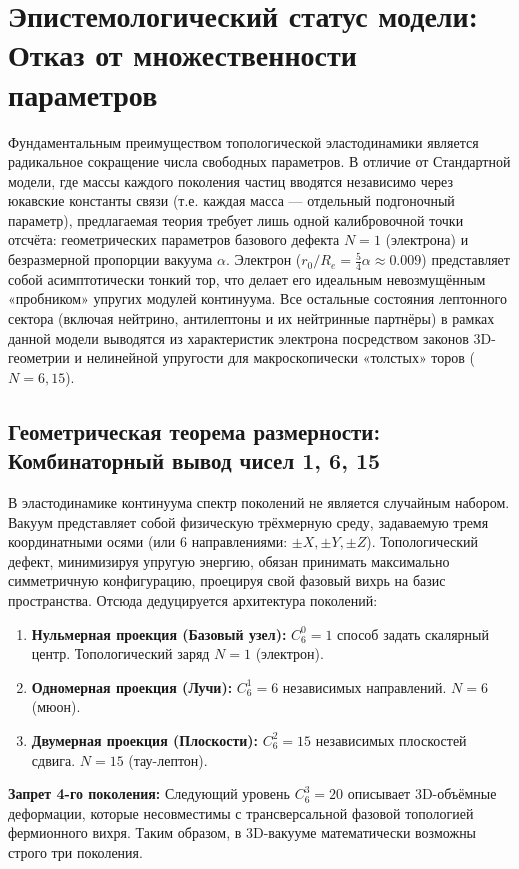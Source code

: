 \documentclass[11pt,a4paper]{article}
\begin{document}
\section{Эпистемологический статус модели: Отказ от множественности параметров}

Фундаментальным преимуществом топологической эластодинамики является радикальное сокращение числа свободных параметров. В отличие от Стандартной модели, где массы каждого поколения частиц вводятся независимо через юкавские константы связи (т.е. каждая масса — отдельный подгоночный параметр), предлагаемая теория требует лишь одной калибровочной точки отсчёта: геометрических параметров базового дефекта \(N=1\) (электрона) и безразмерной пропорции вакуума \(\alpha\). Электрон (\(r_0/R_e = \frac{5}{4}\alpha \approx 0.009\)) представляет собой асимптотически тонкий тор, что делает его идеальным невозмущённым «пробником» упругих модулей континуума. Все остальные состояния лептонного сектора (включая нейтрино, антилептоны и их нейтринные партнёры) в рамках данной модели выводятся из характеристик электрона посредством законов 3D-геометрии и нелинейной упругости для макроскопически «толстых» торов (\(N=6,15\)).

\subsection{Геометрическая теорема размерности: Комбинаторный вывод чисел 1, 6, 15}

В эластодинамике континуума спектр поколений не является случайным набором. Вакуум представляет собой физическую трёхмерную среду, задаваемую тремя координатными осями (или 6 направлениями: \(\pm X, \pm Y, \pm Z\)). Топологический дефект, минимизируя упругую энергию, обязан принимать максимально симметричную конфигурацию, проецируя свой фазовый вихрь на базис пространства. Отсюда дедуцируется архитектура поколений:
\begin{enumerate}
	\item \textbf{Нульмерная проекция (Базовый узел):} \(C_6^0 = 1\) способ задать скалярный центр. Топологический заряд \(N=1\) (электрон).
	\item \textbf{Одномерная проекция (Лучи):} \(C_6^1 = 6\) независимых направлений. \(N=6\) (мюон).
	\item \textbf{Двумерная проекция (Плоскости):} \(C_6^2 = 15\) независимых плоскостей сдвига. \(N=15\) (тау-лептон).
\end{enumerate}
\textbf{Запрет 4-го поколения:} Следующий уровень \(C_6^3 = 20\) описывает 3D-объёмные деформации, которые несовместимы с трансверсальной фазовой топологией фермионного вихря. Таким образом, в 3D-вакууме математически возможны строго три поколения.
\end{document}
